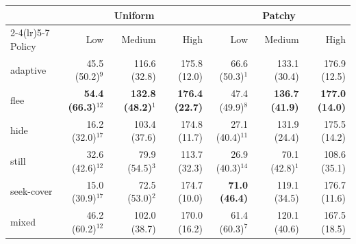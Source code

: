 \begin{tabular}{lrrrrrr}
\toprule
 & \multicolumn{3}{c}{Uniform} & \multicolumn{3}{c}{Patchy} \\
\cmidrule(lr){2-4}\cmidrule(lr){5-7}
Policy & Low & Medium & High & Low & Medium & High \\
\midrule
adaptive & 45.5 (50.2)$^{9}$ & 116.6 (32.8) & 175.8 (12.0) & 66.6 (50.3)$^{1}$ & 133.1 (30.4) & 176.9 (12.5) \\
flee & \textbf{54.4 (66.3)}$^{12}$ & \textbf{132.8 (48.2)}$^{1}$ & \textbf{176.4 (22.7)} & 47.4 (49.9)$^{8}$ & \textbf{136.7 (41.9)} & \textbf{177.0 (14.0)} \\
hide & 16.2 (32.0)$^{17}$ & 103.4 (37.6) & 174.8 (11.7) & 27.1 (40.4)$^{11}$ & 131.9 (24.4) & 175.5 (14.2) \\
still & 32.6 (42.6)$^{12}$ & 79.9 (54.5)$^{3}$ & 113.7 (32.3) & 26.9 (40.3)$^{14}$ & 70.1 (42.8)$^{1}$ & 108.6 (35.1) \\
seek-cover & 15.0 (30.9)$^{17}$ & 72.5 (53.0)$^{2}$ & 174.7 (10.0) & \textbf{71.0 (46.4)} & 119.1 (34.5) & 176.7 (11.6) \\
mixed & 46.2 (60.2)$^{12}$ & 102.0 (38.7) & 170.0 (16.2) & 61.4 (60.3)$^{7}$ & 120.1 (40.6) & 167.5 (18.5) \\
\bottomrule
\end{tabular}
